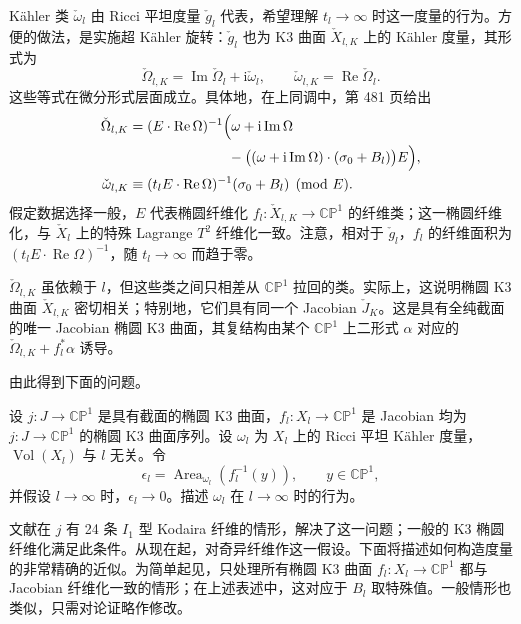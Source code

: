 Kähler 类 $\check\omega_l$ 由 Ricci 平坦度量 $\check g_l$ 代表，希望理解 $t_l\to\infty$ 时这一度量的行为。方便的做法，是实施超 Kähler 旋转：$\check g_l$ 也为 K3 曲面 $\check X_{l,K}$ 上的 Kähler 度量，其形式为
\[
\check\Omega_{l,K}=\operatorname{Im}\check\Omega_l+\mathrm i\check\omega_l,
\qquad\check\omega_{l,K}=\operatorname{Re}\check\Omega_l.
\]
这些等式在微分形式层面成立。具体地，在上同调中，第 481 页给出
\[
\begin{aligned}
\check\Omega_{l,K}
&=(E\cdot\operatorname{Re}\Omega)^{-1}
\Bigl(\omega+\mathrm i\operatorname{Im}\Omega\\
&\hspace{25mm}-\bigl((\omega+\mathrm i\operatorname{Im}\Omega)
\cdot(\sigma_0+B_l)\bigr)E\Bigr),\\
\check\omega_{l,K}
&\equiv(t_lE\cdot\operatorname{Re}\Omega)^{-1}(\sigma_0+B_l)\pmod E.
\end{aligned}
\]
假定数据选择一般，$E$ 代表椭圆纤维化 $f_l\colon\check X_{l,K}\to\mathbb{CP}^1$ 的纤维类；这一椭圆纤维化，与 $\check X_l$ 上的特殊 Lagrange $T^2$ 纤维化一致。注意，相对于 $\check g_l$，$f_l$ 的纤维面积为 $(t_lE\cdot\operatorname{Re}\Omega)^{-1}$，随 $t_l\to\infty$ 而趋于零。

$\check\Omega_{l,K}$ 虽依赖于 $l$，但这些类之间只相差从 $\mathbb{CP}^1$ 拉回的类。实际上，这说明椭圆 K3 曲面 $\check X_{l,K}$ 密切相关；特别地，它们具有同一个 Jacobian $\check J_K$。这是具有全纯截面的唯一 Jacobian 椭圆 K3 曲面，其复结构由某个 $\mathbb{CP}^1$ 上二形式 $\alpha$ 对应的 $\check\Omega_{l,K}+f_l^*\alpha$ 诱导。

由此得到下面的问题。
\begin{problem}\label{prob:7.25}
设 $j\colon J\to\mathbb{CP}^1$ 是具有截面的椭圆 K3 曲面，$f_l\colon X_l\to\mathbb{CP}^1$ 是 Jacobian 均为 $j\colon J\to\mathbb{CP}^1$ 的椭圆 K3 曲面序列。设 $\omega_l$ 为 $X_l$ 上的 Ricci 平坦 Kähler 度量，$\operatorname{Vol}(X_l)$ 与 $l$ 无关。令
\[
\epsilon_l=\operatorname{Area}_{\omega_l}(f_l^{-1}(y)),
\qquad y\in\mathbb{CP}^1,
\]
并假设 $l\to\infty$ 时，$\epsilon_l\to0$。描述 $\omega_l$ 在 $l\to\infty$ 时的行为。
\end{problem}

文献在 $j$ 有 24 条 $I_1$ 型 Kodaira 纤维的情形，解决了这一问题；一般的 K3 椭圆纤维化满足此条件。从现在起，对奇异纤维作这一假设。下面将描述如何构造度量的非常精确的近似。为简单起见，只处理所有椭圆 K3 曲面 $f_l\colon X_l\to\mathbb{CP}^1$ 都与 Jacobian 纤维化一致的情形；在上述表述中，这对应于 $B_l$ 取特殊值。一般情形也类似，只需对论证略作修改。

